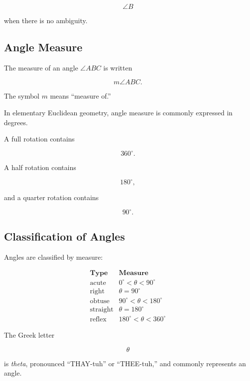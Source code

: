 \[ \angle B \]

when there is no ambiguity.

\subsection{Angle Measure}
\label{subsec:angle-measure}

The measure of an angle \(\angle ABC\) is written

\[ m\angle ABC. \]

The symbol \(m\) means ``measure of.''

In elementary Euclidean geometry, angle measure is commonly expressed in
degrees.

A full rotation contains

\[ 360^\circ. \]

A half rotation contains

\[ 180^\circ, \]

and a quarter rotation contains

\[ 90^\circ. \]

\subsection{Classification of Angles}
\label{subsec:classification-angles}

Angles are classified by measure:

\[
\begin{array}{c|c}
\textbf{Type} & \textbf{Measure}\\
\hline
\text{acute} & 0^\circ<\theta<90^\circ\\
\text{right} & \theta=90^\circ\\
\text{obtuse} & 90^\circ<\theta<180^\circ\\
\text{straight} & \theta=180^\circ\\
\text{reflex} & 180^\circ<\theta<360^\circ
\end{array}
\]

The Greek letter

\[ \theta \]

is \emph{theta}, pronounced ``THAY-tuh'' or ``THEE-tuh,'' and commonly
represents an angle.

